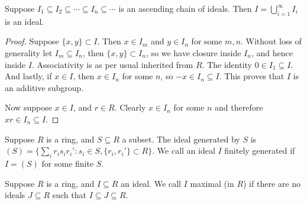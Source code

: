 \begin{proposition}\label{prop:nested-ideals}
    Suppose \(I_1 \subseteq I_2 \subseteq \cdots \subseteq
    I_n \subseteq \cdots\) is an ascending chain of ideals.
    Then \(I = \bigcup_{i=1}^\infty I_i\) is an ideal.
\end{proposition}
\begin{proof}
    Suppose \(\{x,y\} \subset I\).
    Then \(x \in I_m\) and \(y \in I_n\) for some \(m,n\).
    Without loss of generality let \(I_m \subseteq I_n\),
    then \(\{x,y\} \subset I_n\),
    so we have closure inside \(I_n\), and hence inside \(I\).
    Associativity is as per usual inherited from \(R\).
    The identity \(0 \in I_1 \subseteq I\).
    And lastly, if \(x \in I\), then \(x \in I_n\) for some \(n\),
    so \(-x \in I_n \subseteq I\).
    This proves that \(I\) is an additive subgroup.
    
    Now suppose \(x \in I\), and \(r \in R\).
    Clearly \(x \in I_n\) for some \(n\)
    and therefore \(xr \in I_n \subseteq I\).
\end{proof}

\begin{definition}
    Suppose \(R\) is a ring, and \(S \subseteq R\) a subset.
    The ideal generated by \(S\) is
    \((S) = \{\sum_i r_i s_i r_i' : s_i \in S, \{r_i,r_i'\} \subset R\}\).
    We call an ideal \(I\) finitely generated
    if \(I = (S)\) for some finite \(S\).
\end{definition}
\begin{definition}
    Suppose \(R\) is a ring, and \(I \subseteq R\) an ideal.
    We call \(I\) maximal (in \(R\))
    if there are no ideals \(J \subseteq R\) such that \(I \subseteq J \subseteq R\).
\end{definition}

